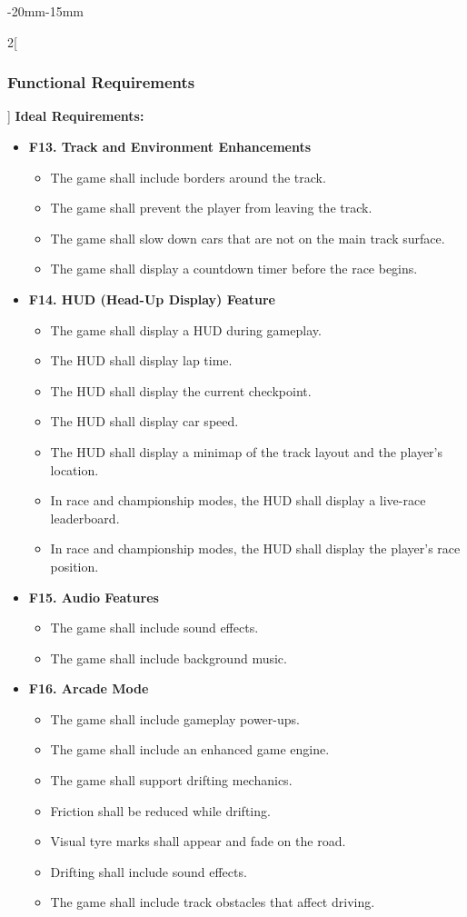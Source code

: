\documentclass[12pt]{article}
\begin{document}
\begin{adjustwidth}{-20mm}{-15mm}
\begin{multicols}{2}[\subsubsection{Functional Requirements}]
\vspace{6pt}
\noindent\textbf{Ideal Requirements:}
\begin{itemize}[leftmargin=*]
\item \textbf{F13. Track and Environment Enhancements}
\begin{itemize}[leftmargin=*]
\item The game shall include borders around the track.
\item The game shall prevent the player from leaving the track.
\item The game shall slow down cars that are not on the main track surface.
\item The game shall display a countdown timer before the race begins.
\end{itemize}

\item \textbf{F14. HUD (Head-Up Display) Feature}
\begin{itemize}[leftmargin=*]
\item The game shall display a HUD during gameplay.
\item The HUD shall display lap time.
\item The HUD shall display the current checkpoint.
\item The HUD shall display car speed.
\item The HUD shall display a minimap of the track layout and the player’s location.
\item In race and championship modes, the HUD shall display a live-race leaderboard.
\item In race and championship modes, the HUD shall display the player’s race position.
\end{itemize}

\item \textbf{F15. Audio Features}
\begin{itemize}[leftmargin=*]
\item The game shall include sound effects.
\item The game shall include background music.
\end{itemize}

\item \textbf{F16. Arcade Mode}
\begin{itemize}[leftmargin=*]
\item The game shall include gameplay power-ups.
\item The game shall include an enhanced game engine.
\item The game shall support drifting mechanics.
\item Friction shall be reduced while drifting.
\item Visual tyre marks shall appear and fade on the road.
\item Drifting shall include sound effects.
\item The game shall include track obstacles that affect driving.
\end{itemize}


\end{itemize}
\end{multicols}
\end{adjustwidth}
\end{document}
